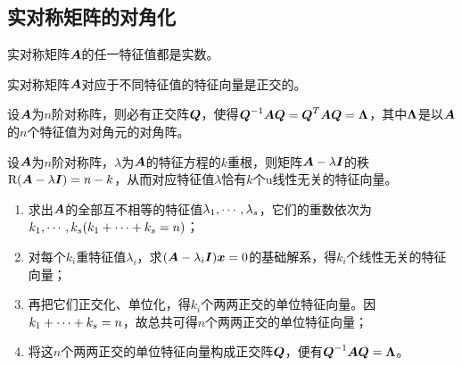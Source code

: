 \subsection{实对称矩阵的对角化}

\begin{frame}
  
  \begin{dingli}
    实对称矩阵$\boldsymbol{A}$的任一特征值都是实数。
  \end{dingli}
  
  \begin{dingli}
    实对称矩阵$\boldsymbol{A}$对应于不同特征值的特征向量是正交的。
  \end{dingli}

  \begin{dingli}
  设$\boldsymbol{A}$为$n$阶对称阵，则必有正交阵$\boldsymbol{Q}$，使得$\boldsymbol{Q}^{-1}\boldsymbol{A}\boldsymbol{Q}=\boldsymbol{Q}^T\boldsymbol{A}\boldsymbol{Q}=\boldsymbol{\Lambda}$，其中$\boldsymbol{\Lambda}$是以$\boldsymbol{A}$的$n$个特征值为对角元的对角阵。
  \end{dingli}

  \begin{tuilun}
    设$\boldsymbol{A}$为$n$阶对称阵，$\lambda$为$\boldsymbol{A}$的特征方程的$k$重根，则矩阵$\boldsymbol{A}-\lambda\boldsymbol{I}$的秩$\mathrm{R}(\boldsymbol{A}-\lambda\boldsymbol{I})=n-k$，从而对应特征值$\lambda$恰有$k$个u线性无关的特征向量。
  \end{tuilun} 
\end{frame}

\begin{frame}
  \begin{enumerate}
  \item 求出$\boldsymbol{A}$的全部互不相等的特征值$\lambda_1,\cdots,\lambda_s$，它们的重数依次为$k_1,\cdots,k_s(k_1+\cdots+k_s=n)$；\\[0.1in]
  \item 对每个$k_i$重特征值$\lambda_i$，求$(\boldsymbol{A}-\lambda_i\boldsymbol{I}){\boldsymbol{x}}=0$的基础解系，得$k_i$个线性无关的特征向量；\\[0.1in]
  \item 再把它们正交化、单位化，得$k_i$个两两正交的单位特征向量。因$k_1+\cdots+k_s=n$，故总共可得$n$个两两正交的单位特征向量；\\[0.1in]
  \item 将这$n$个两两正交的单位特征向量构成正交阵$\boldsymbol{Q}$，便有$\boldsymbol{Q}^{-1}\boldsymbol{A}\boldsymbol{Q}=\boldsymbol{\Lambda}$。
  \end{enumerate}
\end{frame}

